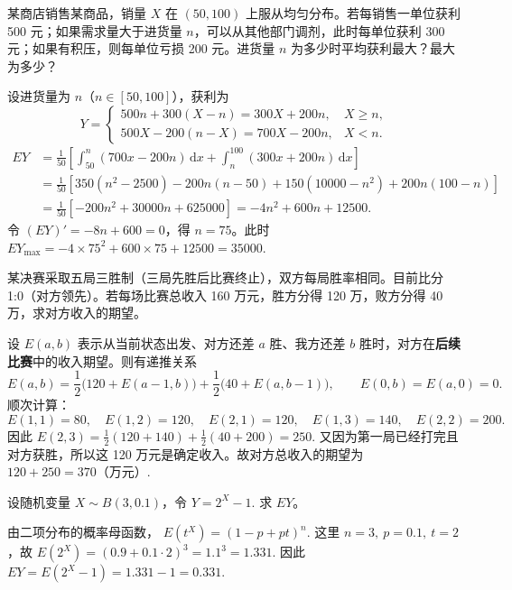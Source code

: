 \documentclass[lang=cn,11pt]{elegantbook}
\begin{document}
\begin{exercise}\label{exer:4-20-shop}
某商店销售某商品，销量 \(X\) 在 \((50,100)\) 上服从均匀分布。若每销售一单位获利 500 元；如果需求量大于进货量 \(n\)，可以从其他部门调剂，此时每单位获利 300 元；如果有积压，则每单位亏损 200 元。进货量 \(n\) 为多少时平均获利最大？最大为多少？
\end{exercise}
\begin{solution}
设进货量为 \(n\)（\(n \in [50,100]\)），获利为
\[
Y = \begin{cases} 500n + 300(X-n) = 300X + 200n, & X \geqslant n, \\ 500X - 200(n-X) = 700X - 200n, & X < n. \end{cases}
\]
\[
\begin{aligned}
EY &= \frac{1}{50}\left[\int_{50}^{n}(700x - 200n)\,\mathrm{d}x + \int_{n}^{100}(300x + 200n)\,\mathrm{d}x\right] \\
&= \frac{1}{50}\left[350(n^2-2500) - 200n(n-50) + 150(10000-n^2) + 200n(100-n)\right] \\
&= \frac{1}{50}\left[-200n^2 + 30000n + 625000\right] = -4n^2 + 600n + 12500.
\end{aligned}
\]
令 \((EY)' = -8n + 600 = 0\)，得 \(n = 75\)。此时
\(
EY_{\max} = -4 \times 75^2 + 600 \times 75 + 12500 = 35000.
\)
\end{solution}



\begin{exercise}\label{exer:4-basketball}
某决赛采取五局三胜制（三局先胜后比赛终止），双方每局胜率相同。目前比分 1:0（对方领先）。若每场比赛总收入 160 万元，胜方分得 120 万，败方分得 40 万，求对方收入的期望。
\end{exercise}
\begin{solution}
设 \(E(a,b)\) 表示从当前状态出发、对方还差 \(a\) 胜、我方还差 \(b\) 胜时，对方在\textbf{后续比赛}中的收入期望。则有递推关系
\[
E(a,b)=\frac12\bigl(120+E(a-1,b)\bigr)+\frac12\bigl(40+E(a,b-1)\bigr),\qquad E(0,b)=E(a,0)=0.
\]
顺次计算：
\[
E(1,1)=80,\quad E(1,2)=120,\quad E(2,1)=120,\quad E(1,3)=140,\quad E(2,2)=200.
\]
因此
\(
E(2,3)=\frac12(120+140)+\frac12(40+200)=250.
\)
又因为第一局已经打完且对方获胜，所以这 120 万元是确定收入。故对方总收入的期望为
\(
120+250=370\text{（万元）}.
\)
\end{solution}


\begin{exercise}\label{exer:src-paper3-iii-02}\label{prob:p3-iii-02}
设随机变量 \(X\sim B(3,0.1)\)，令
\(
Y=2^X-1.
\)
求 \(EY\)。
\end{exercise}
\begin{solution}
由二项分布的概率母函数，
\(
E(t^X)=(1-p+pt)^n.
\)
这里 \(n=3,\ p=0.1,\ t=2\)，故
\(
E(2^X)=(0.9+0.1\cdot2)^3=1.1^3=1.331.
\)
因此
\(
EY=E(2^X-1)=1.331-1=0.331.
\)
\end{solution}
\end{document}

